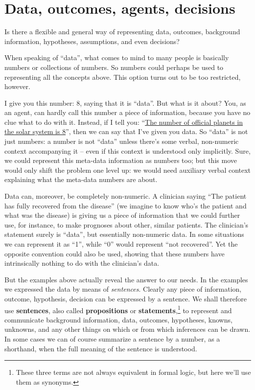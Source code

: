 \documentclass[
  a4paper,
  DIV=11,
  numbers=noendperiod,
  oneside]{scrreprt}
\begin{document}
\hypertarget{data-outcomes-agents-decisions}{%
\section{Data, outcomes, agents,
decisions}\label{data-outcomes-agents-decisions}}

Is there a flexible and general way of representing data, outcomes,
background information, hypotheses, assumptions, and even decisions?

When speaking of ``data'', what comes to mind to many people is
basically numbers or collections of numbers. So numbers could perhaps be
used to representing all the concepts above. This option turns out to be
too restricted, however.

I give you this number: {\(8\),} saying that it is ``data''. But what is
it about? You, as an agent, can hardly call this number a piece of
information, because you have no clue what to do with it. Instead, if I
tell you: ``\href{https://solarsystem.nasa.gov/planets/overview}{The
number of official planets in the solar system is 8}'', then we can say
that I've given you data. So ``data'' is not just numbers: a number is
not ``data'' unless there's some verbal, non-numeric context
accompanying it -- even if this context is understood only implicitly.
Sure, we could represent this meta-data information as numbers too; but
this move would only shift the problem one level up: we would need
auxiliary verbal context explaining what the meta-data numbers are
about.

Data can, moreover, be completely non-numeric. A clinician saying ``The
patient has fully recovered from the disease'' (we imagine to know who's
the patient and what was the disease) is giving us a piece of
information that we could further use, for instance, to make prognoses
about other, similar patients. The clinician's statement surely is
``data'', but essentially non-numeric data. In some situations we can
represent it as ``1'', while ``0'' would represent ``not recovered''.
Yet the opposite convention could also be used, showing that these
numbers have intrinsically nothing to do with the clinician's data.

But the examples above actually reveal the answer to our needs. In the
examples we expressed the data by means of \emph{sentences}. Clearly any
piece of information, outcome, hypothesis, decision can be expressed by
a sentence. We shall therefore use {\textbf{sentences}}, also called
\textbf{propositions} or \textbf{statements},\footnote{These three terms
  are not always equivalent in formal logic, but here we'll use them as
  synonyms.} to represent and communicate background information, data,
outcomes, hypotheses, knowns, unknowns, and any other things on which or
from which inferences can be drawn. In some cases we can of course
summarize a sentence by a number, as a shorthand, when the full meaning
of the sentence is understood.
\end{document}
